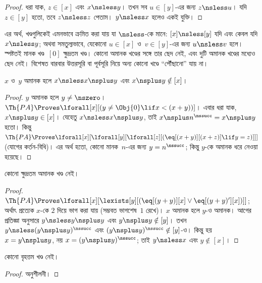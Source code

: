 \documentclass[../../../include/open-logic-section]{subfiles}
\begin{document}
\begin{proof}
ধরা যাক, $z \in [x]$ এবং $x \nsless y$। তখন সব $u \in [y]$-এর জন্য
$z \nsless u$। যদি $z \in [y]$ হতো, তবে $z \nsless z$ পেতাম।
$y \nsless x$ হলেও একই যুক্তি।
\end{proof}

\begin{explain}
এর অর্থ, খণ্ডগুলিকেই এমনভাবে ক্রমিত করা যায় যা $\nsless$-কে মানে:
$[x] \nsless [y]$ যদি এবং কেবল যদি $x \nsless y$; অথবা সমতুল্যভাবে,
যেকোনো $u \in [x]$ ও~$v \in [y]$-এর জন্য $u \nsless v$ হলে। স্পষ্টতই
মানক খণ্ড~$[0]$ ক্ষুদ্রতম খণ্ড। কোনো অমানক খণ্ডের সঙ্গে তার ছেদ নেই,
এবং দুটি অমানক খণ্ডের মধ্যেও ছেদ নেই। বিশেষত বারবার উত্তরসূরি বা
পূর্বসূরি নিয়ে অন্য কোনো খণ্ডে ``পৌঁছানো'' যায় না।
\end{explain}

\begin{prop}
$x$ ও~$y$ অমানক হলে $x \nsless x \nsplus y$ এবং
$x \nsplus y \notin [x]$।
\end{prop}

\begin{proof}
$y$ অমানক হলে $y \neq \nszero$। $\Th{PA} \Proves
\lforall[x][(y \neq \Obj{0} \lif x < (x+y))]$। এবার ধরা যাক,
$x \nsplus y \in [x]$। যেহেতু $x \nsless x \nsplus y$, তাই
$x \nsplus n^\nssucc=x \nsplus y$ হতো। কিন্তু
$\Th{PA} \Proves
\lforall[x][\lforall[y][\lforall[z][(\eq[(x+y)][(x+z)] \lif y = z)]]]$
(যোগের কর্তন-বিধি)। এর অর্থ হতো, কোনো মানক~$n$-এর জন্য
$y=n^\nssucc$; কিন্তু $y$-কে অমানক ধরে নেওয়া হয়েছে।
\end{proof}

\begin{prop}
কোনো ক্ষুদ্রতম অমানক খণ্ড নেই।
\end{prop}

\begin{proof}
$\Th{PA} \Proves \lforall[x][\lexists[y][(\eq[(y+y)][x] \lor
      \eq[(y+y)'][x])]]$; অর্থাৎ প্রত্যেক $x$-কে $2$ দিয়ে ভাগ করা যায়
(সম্ভবত ভাগশেষ~$1$ রেখে)। $x$ অমানক হলে $y$-ও অমানক। আগের প্রতিজ্ঞা
অনুসারে $y \nsless y \nsplus y$ এবং $y \nsplus y \notin [y]$। তখন
$y \nsless (y \nsplus y)^\nssucc$ এবং
$(y \nsplus y)^\nssucc \notin [y]$-ও। কিন্তু হয়
$x=y \nsplus y$, নয় $x=(y \nsplus y)^\nssucc$; তাই $y \nsless x$
এবং $y \notin [x]$।
\end{proof}

\begin{prop}
কোনো বৃহত্তম খণ্ড নেই।
\end{prop}

\begin{proof}
অনুশীলনী।
\end{proof}
\end{document}
